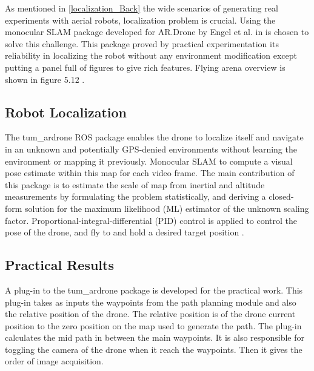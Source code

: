 As mentioned in \ref{localization_Back} the wide scenarios of generating real experiments with aerial robots, localization problem is crucial. Using the monocular SLAM package developed for AR.Drone by Engel et al. in \cite{engel14ras,engel12iros}  is chosen to solve this challenge. This package proved by practical experimentation its reliability in localizing the robot without any environment modification except putting a panel full of figures to give rich features. Flying arena overview is shown in figure 5.12 .



\subsection{Robot Localization }

The tum\_ardrone ROS package enables the drone to localize itself  and navigate in an unknown and potentially GPS-denied environments without learning the environment or mapping it previously. Monocular SLAM to compute a visual pose estimate within this map for each video frame. The main contribution of this package is to estimate the scale of map from inertial and altitude measurements by formulating the problem statistically, and deriving a closed-form solution for the maximum likelihood (ML) estimator of the unknown scaling factor. Proportional-integral-differential (PID) control is applied to control the pose of the drone, and fly to and hold a desired target position \cite{engel14ras}.

\subsection{Practical Results}

A plug-in to the tum\_ardrone package is developed for the practical work. This plug-in takes as inputs the waypoints from the path planning module and also the relative position of the drone. The relative position is of the drone current position to the zero position on the map used to generate the path. The plug-in calculates the mid path in between the main waypoints. It is also responsible for toggling the camera of the drone when it reach the waypoints. Then it gives the order of image acquisition.


